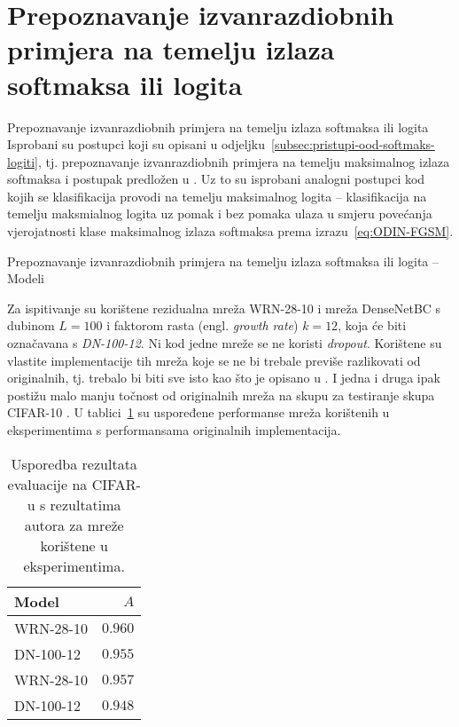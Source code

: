 \documentclass{beamer}
\begin{document}
\section{Prepoznavanje izvanrazdiobnih primjera na temelju izlaza softmaksa ili logita}

\begin{frame}[allowframebreaks=0.9]{Prepoznavanje izvanrazdiobnih primjera na temelju izlaza softmaksa ili logita }
Isprobani su postupci koji su opisani u odjeljku~\ref{subsec:pristupi-ood-softmaks-logiti}, tj. prepoznavanje izvanrazdiobnih primjera na temelju maksimalnog izlaza softmaksa \citep{Hendrycks:2016:BDMOODE} i postupak predložen u \citet{Liang:2017:PDOODENN}. Uz to su isprobani analogni postupci kod kojih se klasifikacija provodi na temelju maksimalnog logita -- klasifikacija na temelju maksmialnog logita uz pomak i bez pomaka ulaza u smjeru povećanja vjerojatnosti klase maksimalnog izlaza softmaksa prema izrazu~\eqref{eq:ODIN-FGSM}.

\end{frame}

\begin{frame}[allowframebreaks=0.9]{Prepoznavanje izvanrazdiobnih primjera na temelju izlaza softmaksa ili logita -- Modeli}

Za ispitivanje su korištene rezidualna mreža WRN-28-10 \citep{Zagoruyko:2016:WRN} i mreža DenseNetBC \citep{Huang:2016:DCCN} s dubinom $L=100$ i faktorom rasta (engl. \textit{growth rate}) $k=12$, koja će biti označavana s \textit{DN-100-12}. Ni kod jedne mreže se ne koristi \textit{dropout}. Korištene su vlastite implementacije tih mreža koje se ne bi trebale previše razlikovati od originalnih, tj. trebalo bi biti sve isto kao što je opisano u \citet{Zagoruyko:2016:WRN,Huang:2016:DCCN}. I jedna i druga ipak postižu malo manju točnost od originalnih mreža na skupu za testiranje skupa CIFAR-10 \citep{Krizhevsky:2009:LMLFTI}. U  tablici~\ref{tab:evaluacija-cifar} su uspoređene performanse mreža korištenih u eksperimentima s performansama originalnih implementacija.

\begin{table}
	\centering\small
	\begin{tabular}{lr}
		\toprule
		\bfseries Model & $A$ \\
		\midrule
		WRN-28-10 \citep{Zagoruyko:2016:WRN} & $0.960$ \\
		DN-100-12 \citep{Huang:2016:DCCN} & $0.955$ \\
		\midrule
		WRN-28-10 & $0.957$ \\
		DN-100-12 & $0.948$ \\
		\bottomrule
	\end{tabular}
	\caption{Usporedba rezultata evaluacije na CIFAR-u s rezultatima autora za mreže korištene u eksperimentima.}
	\label{tab:evaluacija-cifar}
\end{table}
\end{frame}
\end{document}
